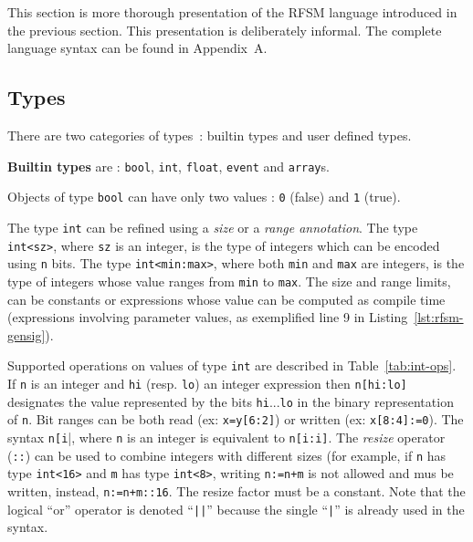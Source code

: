 This section is more thorough presentation of the RFSM language introduced in the previous
section. This presentation is deliberately informal. The complete language syntax can
be found in Appendix~A.

\subsection{Types}
\label{sec:types}

There are two categories of types~: builtin types and user defined types.

\medskip
\textbf{Builtin types} are : \texttt{bool}, \texttt{int}, \texttt{float}, \texttt{event} and
\texttt{array}s.

\step Objects of type \texttt{bool} can have only two values : \texttt{0} (false) and \texttt{1} (true).

\step The type \texttt{int} can be refined using a \emph{size} or a \emph{range annotation}. The
type \verb|int<sz>|, where \verb|sz| is an integer, is the type of integers which can be encoded using
\verb|n| bits. The type \verb|int<min:max>|, where both \verb|min| and \verb|max| are integers, is
the type of integers whose value ranges from \verb|min| to \verb|max|. The size and range limits,
can be constants or expressions whose value can be computed as compile time
(expressions involving parameter values, as exemplified line 9 in Listing~\ref{lst:rfsm-gensig}).

\step Supported operations on values of type \texttt{int} are described in Table~\ref{tab:int-ops}.
If \verb|n| is an integer and \verb|hi| (resp. \verb|lo|) an integer expression then \verb|n[hi:lo]|
designates the value represented by the bits \verb|hi|...\verb|lo| in the binary representation of
\verb|n|. Bit ranges can be both read (ex: \verb|x=y[6:2]|) or written (ex: \verb|x[8:4]:=0|). The
syntax \verb|n[i||, where \verb|n| is an integer is equivalent to \verb|n[i:i]|. The \emph{resize}
operator (\verb|::|) can be used to combine integers with different sizes (for example, if \verb|n|
has type \verb|int<16>| and \verb|m| has type \verb|int<8>|, writing \verb|n:=n+m| is not allowed
and mus be written, instead, \verb|n:=n+m::16|. The resize factor must be a constant. Note that the
logical ``or'' operator is denoted ``\verb+||+'' because the single ``\verb+|+'' is already used in
the syntax.

